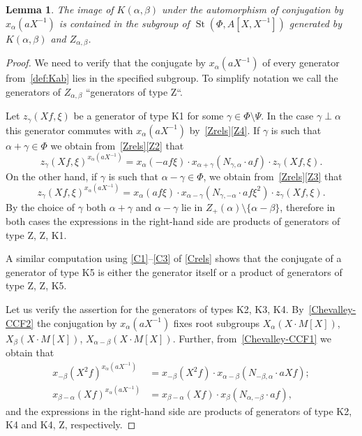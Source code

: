 \documentclass[oneside, 8pt]{amsart}
\newtheorem{lemma}{Lemma}
\theoremstyle{remark}
\theoremstyle{definition}
\numberwithin{lemma}{section}
\numberwithin{prop}{section}
\numberwithin{corollary}{section}
\numberwithin{externaltheorem}{section}
\DeclareMathOperator{\St}{St}
\numberwithin{equation}{section}
\begin{document}
\begin{lemma} \label{image-K-a-b} The image of $K(\alpha, \beta)$ under the automorphism of conjugation by $x_\alpha(aX^{-1})$ is contained in the subgroup of $\St(\Phi, A[X, X^{-1}])$ generated by $K(\alpha, \beta)$ and $Z_{\alpha, \beta}$. \end{lemma}
\begin{proof} We need to verify that the conjugate by $x_\alpha(aX^{-1})$ of every generator from~\cref{def:Kab} lies in the specified subgroup. To simplify notation we call the generators of  $Z_{\alpha,\beta}$ ``generators of type Z``. 

Let $z_\gamma(Xf, \xi)$ be a generator of type K1 for some $\gamma \in \Phi \setminus \Psi$.
In the case $\gamma \perp \alpha$ this generator commutes with $x_\alpha(aX^{-1})$ by~\cref{Zrels}\eqref{Z4}.
If $\gamma$ is such that $\alpha + \gamma \in \Phi$ we obtain from~\cref{Zrels}\eqref{Z2} that
\begin{equation} z_{\gamma}(Xf, \xi) ^ {x_{\alpha}(aX^{-1})} = x_{\alpha} (- af\xi) \cdot x_{\alpha+\gamma} (N_{\gamma, \alpha}\cdot af) \cdot z_{\gamma}(Xf, \xi). \end{equation}
On the other hand, if $\gamma$ is such that $\alpha - \gamma \in \Phi$, we obtain from~\cref{Zrels}\eqref{Z3} that
\begin{equation} z_{\gamma}(Xf, \xi) ^ {x_{\alpha}(aX^{-1})} = x_{\alpha} (af\xi) \cdot x_{\alpha-\gamma} (N_{\gamma,-\alpha}\cdot af\xi^2) \cdot z_{\gamma}(Xf, \xi). \end{equation}
By the choice of $\gamma$ both $\alpha + \gamma$ and $\alpha - \gamma$ lie in $Z_+(\alpha) \setminus \{\alpha - \beta\}$, therefore in both cases the expressions in the right-hand side are products of generators of type Z, Z, K1.

A similar computation using \eqref{C1}--\eqref{C3} of \cref{Crels} shows that the conjugate of a generator of type K5 is either the generator itself or a product of generators of type Z, Z, K5.

Let us verify the assertion for the generators of types K2, K3, K4.
By~\eqref{Chevalley-CCF2} the conjugation by $x_\alpha(aX^{-1})$ fixes root subgroups $X_{\alpha}(X\cdot M[X])$, $X_{\beta}(X\cdot M[X])$, $X_{\alpha-\beta}(X\cdot M[X])$. 
Further, from~\eqref{Chevalley-CCF1} we obtain that
\begin{align*}
 x_{-\beta}(X^2f)^{x_\alpha(aX^{-1})}     &= x_{-\beta}(X^2f) \cdot x_{\alpha-\beta}(N_{-\beta, \alpha} \cdot aXf);\\
 x_{\beta-\alpha}(Xf)^{x_\alpha(aX^{-1})} &= x_{\beta-\alpha}(Xf) \cdot x_{\beta}(N_{\alpha,-\beta}\cdot af),
\end{align*}
and the expressions in the right-hand side are products of generators of type K2, K4 and K4, Z, respectively.


\end{proof}
\end{document}
